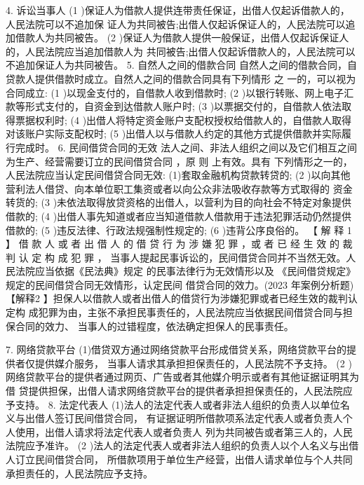 \documentclass[UTF8,12pt]{ctexart}
\numberwithin{equation}{section} %
\numberwithin{figure}{section}
\numberwithin{table}{section}
\begin{document}
	4. 诉讼当事人
	(1 )保证人为借款人提供连带责任保证，出借人仅起诉借款人的，人民法院可以不追加保 证人为共同被告;出借人仅起诉保证人的，人民法院可以追加借款人为共同被告。
	(2 )保证人为借款人提供一般保证，出借人仅起诉保证人的，人民法院应当追加借款人为 共同被告;出借人仅起诉借款人的，人民法院可以不追加保证人为共同被告。
	5. 自然人之间的借款合同 自然人之间的借款合同，自贷款人提供借款时成立。自然人之间的借款合同具有下列情形 之 一的，可以视为合同成立:
	(1 )以现金支付的，自借款人收到借款时;
	(2 )以银行转账、网上电子汇款等形式支付的，自资金到达借款人账户时;
	(3 )以票据交付的，自借款人依法取得票据权利时;
	(4 )出借人将特定资金账户支配权授权给借款人的，自借款人取得对该账户实际支配权时; (5 )出借人以与借款人约定的其他方式提供借款并实际履行完成时。
	6. 民间借贷合同的无效 法人之间、非法人组织之间以及它们相互之间为生产、经营需要订立的民间借贷合同 ，原 则 上有效。具有 下列情形之一的，人民法院应当认定民间借贷合同无效: (1)套取金融机构贷款转贷的;
	(2 )以向其他营利法人借贷、向本单位职工集资或者以向公众非法吸收存款等方式取得的 资金转货的;
	(3 )未依法取得放贷资格的出借人，以营利为目的向社会不特定对象提供借款的;
	(4 )出借人事先知道或者应当知道借款人借款用于违法犯罪活动仍然提供借款的;
	(5 )违反法律、行政法规强制性规定的;
	(6 )违背公序良俗的。
	【 解 释 1 】 借 款 人 或 者 出 借 人 的 借 贷 行 为 涉 嫌 犯 罪 ，或 者 已 经 生 效 的 裁 判 认 定 构 成 犯 罪 ， 当事人提起民事诉讼的，民间借贷合同并不当然无效。人民法院应当依据《民法典》规定 的民事法律行为无效情形以及 《民间借贷规定》规定的民间借贷合同无效情形，认定民间 借贷合同的效力。(2023 年案例分析题)
	【解释2 】担保人以借款人或者出借人的借贷行为涉嫌犯罪或者已经生效的裁判认定构 成犯罪为由，主张不承担民事责任的，人民法院应当依据民间借贷合同与担保合同的效力、 当事人的过错程度，依法确定担保人的民事责任。
	
	
	7. 网络贷款平台 (1)借贷双方通过网络贷款平台形成借贷关系，网络贷款平台的提供者仅提供媒介服务， 当事人请求其承担担保责任的，人民法院不予支持。
	(2 )网络贷款平台的提供者通过网页、广告或者其他媒介明示或者有其他证据证明其为借 贷提供担保，出借人请求网络贷款平台的提供者承担担保责任的，人民法院应予支持。
	8. 法定代表人 (1)法人的法定代表人或者非法人组织的负责人以单位名义与出借人签订民间借贷合同， 有证据证明所借款项系法定代表人或者负责人个人使用，出借人请求将法定代表人或者负责人 列为共同被告或者第三人的，人民法院应予准许。
	(2 )法人的法定代表人或者非法人组织的负责人以个人名义与出借人订立民间借贷合同， 所借款项用于单位生产经营，出借人请求单位与个人共同承担责任的，人民法院应予支持。
	
\end{document}
